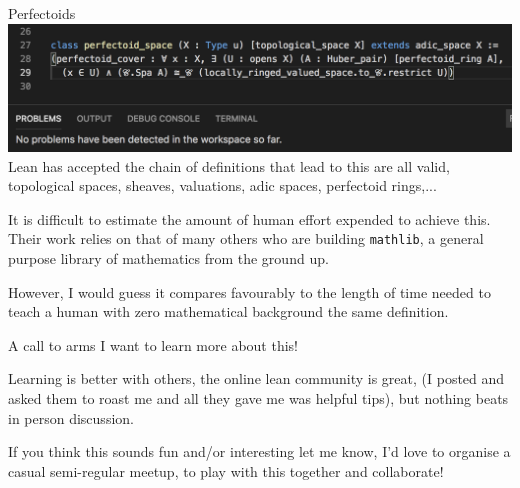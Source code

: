 \begin{frame}{Perfectoids}
    \includegraphics[width=\textwidth]{perfectoid.png}
    Lean has accepted the chain of definitions that lead to this are all valid, topological spaces, sheaves, valuations, adic spaces, perfectoid rings,...
    \pause

    It is difficult to estimate the amount of human effort expended to achieve this. \pause
    Their work relies on that of many others who are building \texttt{mathlib}, a general purpose library of mathematics from the ground up. \pause

    However, I would guess it compares favourably to the length of time needed to teach a human with zero mathematical background the same definition.
\end{frame}

\begin{frame}{A call to arms}
    I want to learn more about this!\pause

    Learning is better with others, the online lean community is great, (I posted and asked them to roast me and all they gave me was helpful tips), but nothing beats in person discussion.\pause

    If you think this sounds fun and/or interesting let me know, I'd love to organise a casual semi-regular meetup, to play with this together and collaborate!
\end{frame}


